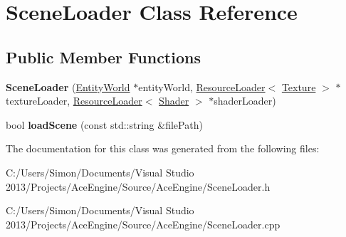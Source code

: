 \hypertarget{class_scene_loader}{}\section{Scene\+Loader Class Reference}
\label{class_scene_loader}
\subsection*{Public Member Functions}
\begin{DoxyCompactItemize}
\item 
\hypertarget{class_scene_loader_a067bebc3d013526109b60e2c90906ab3}{}{\bfseries Scene\+Loader} (\hyperlink{class_entity_world}{Entity\+World} $\ast$entity\+World, \hyperlink{class_resource_loader}{Resource\+Loader}$<$ \hyperlink{struct_texture}{Texture} $>$ $\ast$texture\+Loader, \hyperlink{class_resource_loader}{Resource\+Loader}$<$ \hyperlink{struct_shader}{Shader} $>$ $\ast$shader\+Loader)\label{class_scene_loader_a067bebc3d013526109b60e2c90906ab3}

\item 
\hypertarget{class_scene_loader_ae5d06398432cf57635e6bdff4e61376d}{}bool {\bfseries load\+Scene} (const std\+::string \&file\+Path)\label{class_scene_loader_ae5d06398432cf57635e6bdff4e61376d}

\end{DoxyCompactItemize}


The documentation for this class was generated from the following files\+:\begin{DoxyCompactItemize}
\item 
C\+:/\+Users/\+Simon/\+Documents/\+Visual Studio 2013/\+Projects/\+Ace\+Engine/\+Source/\+Ace\+Engine/Scene\+Loader.\+h\item 
C\+:/\+Users/\+Simon/\+Documents/\+Visual Studio 2013/\+Projects/\+Ace\+Engine/\+Source/\+Ace\+Engine/Scene\+Loader.\+cpp\end{DoxyCompactItemize}
